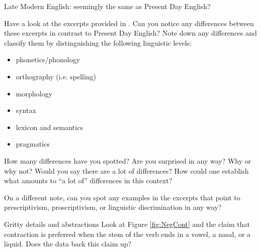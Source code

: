 \begin{exercises}{Late Modern English: seemingly the same as Present Day English?}
\chili{}

Have a look at the excerpts provided in . Can you notice any differences between these excerpts in contrast to Present Day English? Note down any differences and classify them by distinguishing the following linguistic levels:
\begin{itemize}
\item phonetics/phonology
\item orthography (i.e. spelling)
\item morphology
\item syntax
\item lexicon and semantics
\item pragmatics
\end{itemize}

\noindent How many differences have you spotted? Are you surprised in any way? Why or why not? Would you say there are a lot of differences? How could one establish what amounts to ``a lot of'' differences in this context?

On a different note, can you spot any examples in the excerpts that point to prescriptivism, proscriptivism, or linguistic discrimination in any way?

\end{exercises}

\begin{exercises}{Gritty details and abstractions}
Look at Figure \ref{fig:NegCont} and the claim that contraction is preferred when the stem of the verb ends in a vowel, a nasal, or a liquid. Does the data back this claim up?

\end{exercises}

